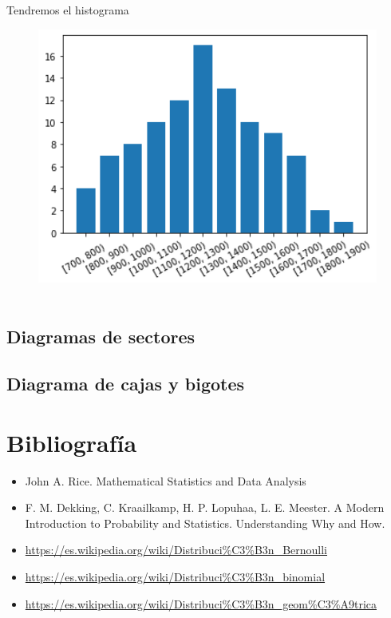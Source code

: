 \documentclass[
]{article}
\providecommand{\tightlist}{%
  \setlength{\itemsep}{0pt}\setlength{\parskip}{0pt}}
\begin{document}
Tendremos el histograma

\begin{figure}
\centering
\includegraphics[width=4.6875in,height=\textheight]{img/histograma2.png}
\caption{~}
\end{figure}

\hypertarget{diagramas-de-sectores}{%
\subsection{Diagramas de sectores}\label{diagramas-de-sectores}}

\hypertarget{diagrama-de-cajas-y-bigotes}{%
\subsection{Diagrama de cajas y
bigotes}\label{diagrama-de-cajas-y-bigotes}}

\hypertarget{bibliografuxeda}{%
\section{Bibliografía}\label{bibliografuxeda}}

\begin{itemize}
\tightlist
\item
  John A. Rice. Mathematical Statistics and Data Analysis
\item
  F. M. Dekking, C. Kraailkamp, H. P. Lopuhaa, L. E. Meester. A Modern
  Introduction to Probability and Statistics. Understanding Why and How.
\item
  \url{https://es.wikipedia.org/wiki/Distribuci\%C3\%B3n_Bernoulli}
\item
  \url{https://es.wikipedia.org/wiki/Distribuci\%C3\%B3n_binomial}
\item
  \url{https://es.wikipedia.org/wiki/Distribuci\%C3\%B3n_geom\%C3\%A9trica}
\end{itemize}
\end{document}
